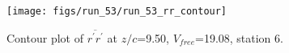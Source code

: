 \begin{figure}[H]
\centering
\texttt{[image: figs/run\_53/run\_53\_rr\_contour]}
\caption{Contour plot of $\overline{r^\prime r^\prime}$ at $z/c$=9.50, $V_{free}$=19.08, station 6.}
\label{fig:run_53_rr_contour}
\end{figure}



